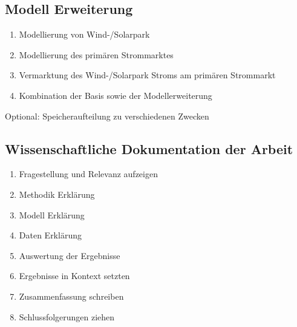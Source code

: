 \documentclass[british,         %
BCOR=2mm,                       %
11pt,                           %
a4paper,						%
oneside,						%
cdgeometry,                     %
toc=chapterentrydotfill,        %
toc=indent,                     %
bibliography=totoc,         	%
listof=totoc,                   %
numbers=noenddot,				%
parskip=full,                   %
cdmath=false					%
]{article}                  %
\begin{document}
\subsection{Modell Erweiterung}
\begin{enumerate}
	\item 	Modellierung von Wind-/Solarpark
	\item 	Modellierung des primären Strommarktes
	\item 	Vermarktung des Wind-/Solarpark Stroms am primären Strommarkt
	\item 	Kombination der Basis sowie der Modellerweiterung
\end{enumerate}

Optional: Speicheraufteilung zu verschiedenen Zwecken

\subsection{Wissenschaftliche Dokumentation der Arbeit}
\begin{enumerate}
	\item Fragestellung und Relevanz aufzeigen
	\item 	Methodik Erklärung
	\item 	Modell Erklärung
	\item 	Daten Erklärung
	\item 	Auswertung der Ergebnisse
	\item 	Ergebnisse in Kontext setzten
	\item 	Zusammenfassung schreiben
	\item 	Schlussfolgerungen ziehen
\end{enumerate}
\end{document}
